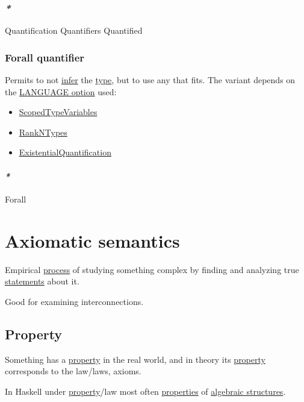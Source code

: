 \documentclass[a4paper,14pt,oneside]{book}
\begin{document}
\subsubsection{\emph{*}}
\label{sec:org5536ad8}

\label{org3ba7cbd}Quantification
\label{org32d2bad}Quantifiers
\label{org351c142}Quantified

\subsubsection{\label{orgdbb4929}Forall quantifier}
\label{sec:orgfe5bbde}
Permits to not \hyperref[orgb91f150]{infer} the \hyperref[orgde40363]{type}, but to use any that fits. The variant depends on the \hyperref[orgaa838ac]{LANGUAGE option} used:
\begin{itemize}
\item \hyperref[org9f21a6a]{ScopedTypeVariables}
\item \hyperref[org05334eb]{RankNTypes}
\item \hyperref[org10ab54d]{ExistentialQuantification}
\end{itemize}

\paragraph{\emph{*}}
\label{sec:org5bca05d}

\label{org143531a}Forall

\section{\label{org66716d3}Axiomatic semantics}
\label{sec:org99b529b}
Empirical \hyperref[org8b072db]{process} of studying something complex by finding and analyzing true \hyperref[org3975ce5]{statements} about it.

Good for examining interconnections.

\subsection{\label{org81d0df4}Property}
\label{sec:org0c18ee1}
Something has a \hyperref[org81d0df4]{property} in the real world, and in theory its \hyperref[org81d0df4]{property} corresponds to the law/laws, axioms.

In Haskell under \hyperref[org81d0df4]{property}/law most often \hyperref[orgaebb0b7]{properties} of \hyperref[org78367b9]{algebraic structures}.
\end{document}
